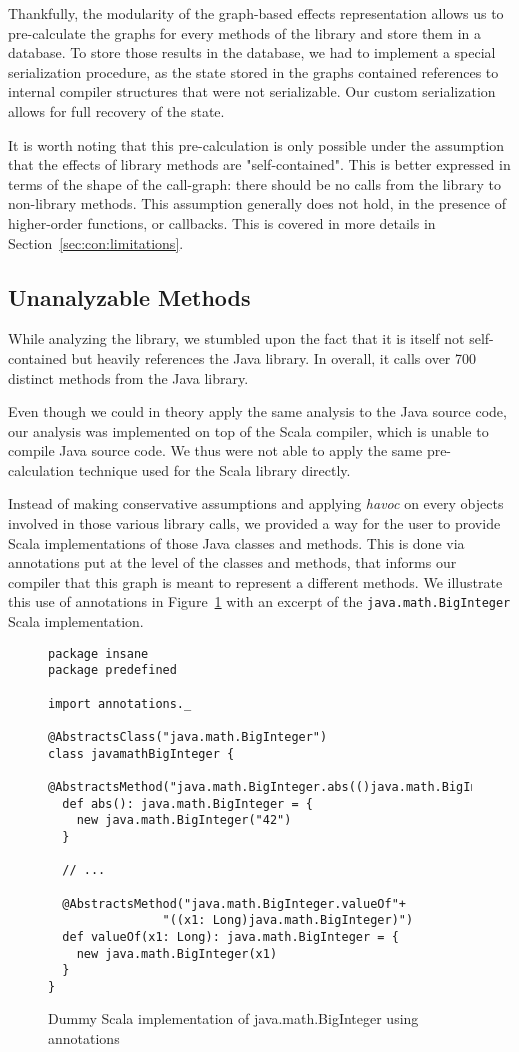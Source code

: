 Thankfully, the modularity of the graph-based effects representation allows us
to pre-calculate the graphs for every methods of the library and store them in
a database. To store those results in the database, we had to implement a
special serialization procedure, as the state stored in the graphs contained
references to internal compiler structures that were not serializable. Our custom
serialization allows for full recovery of the state.

It is worth noting that this pre-calculation is only possible under the
assumption that the effects of library methods are "self-contained". This is better
expressed in terms of the shape of the call-graph: there should be no calls
from the library to non-library methods. This assumption generally does not
hold, in the presence of higher-order functions, or callbacks. This is covered in more
details in Section~\ref{sec:con:limitations}.

\subsection{Unanalyzable Methods}
While analyzing the library, we stumbled upon the fact that it is itself not
self-contained but heavily references the Java library. In overall, it calls
over 700 distinct methods from the Java library.

Even though we could in theory apply the same analysis to the Java source code, our
analysis was implemented on top of the Scala compiler, which is unable to
compile Java source code. We thus were not able to apply the same
pre-calculation technique used for the Scala library directly.

Instead of making conservative assumptions and applying \emph{havoc} on every
objects involved in those various library calls, we provided a way for the user
to provide Scala implementations of those Java classes and methods. This is
done via annotations put at the level of the classes and methods, that
informs our compiler that this graph is meant to represent a different methods.
We illustrate this use of annotations in Figure~\ref{fig:imp:annotations} with
an excerpt of the \verb=java.math.BigInteger= Scala implementation.
\begin{figure}[h]
    \centering
\begin{lstlisting}
package insane
package predefined

import annotations._

@AbstractsClass("java.math.BigInteger")
class javamathBigInteger {
  @AbstractsMethod("java.math.BigInteger.abs(()java.math.BigInteger)")
  def abs(): java.math.BigInteger = {
    new java.math.BigInteger("42")
  }

  // ...

  @AbstractsMethod("java.math.BigInteger.valueOf"+
                "((x1: Long)java.math.BigInteger)")
  def valueOf(x1: Long): java.math.BigInteger = {
    new java.math.BigInteger(x1)
  }
}
\end{lstlisting}
    \caption{Dummy Scala implementation of java.math.BigInteger using annotations}
    \label{fig:imp:annotations}
\end{figure}
